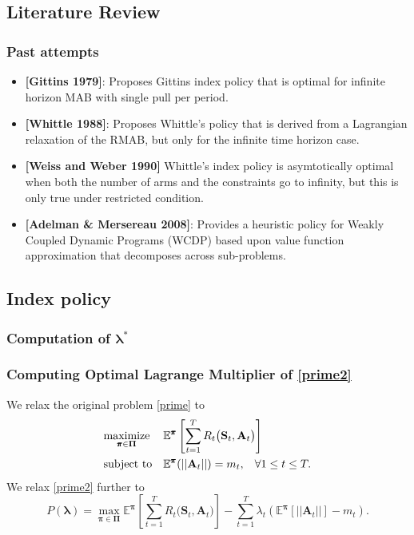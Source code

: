 \documentclass{beamer}
\newcommand{\lambdav}{\pmb{\lambda}}
\newcommand{\allp}{\pmb{\pi}}
\newcommand{\allpset}{\mathbf{\Pi}}
\newcommand{\allstater}{\mathbf{S}}
\newcommand{\allar}{\mathbf{A}}
\newcommand{\allr}{R}
\begin{document}
\subsection{Literature Review}
\begin{frame}[plain]
\frametitle{Past attempts}
\begin{itemize}
\item \textbf{[Gittins 1979]}: Proposes Gittins index policy that is optimal for infinite horizon MAB with single pull per period.
\item \textbf{[Whittle 1988]}: Proposes Whittle's policy that is derived from a Lagrangian relaxation of the RMAB, but only for the infinite time horizon case.\\
\item \textbf{[Weiss and Weber 1990]} Whittle's index policy is asymtotically optimal when both the number of arms and the constraints go to infinity, but this is only true under restricted condition. 
\item \textbf{[Adelman \& Mersereau 2008]}: Provides a heuristic policy for Weakly Coupled Dynamic Programs (WCDP) based upon value function approximation that decomposes across sub-problems. 
\end{itemize}
\end{frame}
\subsection{Index policy}
\begin{frame}[plain]
\tableofcontents[currentsubsection,subsubsectionstyle=show]
\end{frame}
\subsubsection{Computation of $\lambdav^*$}
\begin{frame}[plain]
\frametitle{Computing Optimal Lagrange Multiplier of \eqref{prime2}}
We relax the original problem \eqref{prime} to
\begin{equation}\label{prime2}
\begin{aligned}
& \underset{\allp\in\allpset}{\text{maximize}}
& & \mathbb{E}^{\allp}\left[\sum_{t=1}^{T}\allr_t\big(\allstater_t,\allar_t\big)\right] \\
& \text{subject to}
& & \mathbb{E}^{\allp}(||\allar_t||)=m_t, \hspace{3mm}\forall 1\leq t\leq T.
\end{aligned}
\end{equation}
We relax \eqref{prime2} further to 
\begin{equation}\label{ub}
 P(\lambdav)=\max_{\allp\in \allpset}\mathbb{E}^{\allp}\left[\sum_{t=1}^{T}\allr_t\big(\allstater_t,\allar_t\big)\right]-\sum_{t=1}^T\lambda_t\left(\mathbb{E}^{\allp}[||\allar_t||]-m_t\right).
 \end{equation} 
\end{frame}
\end{document}

